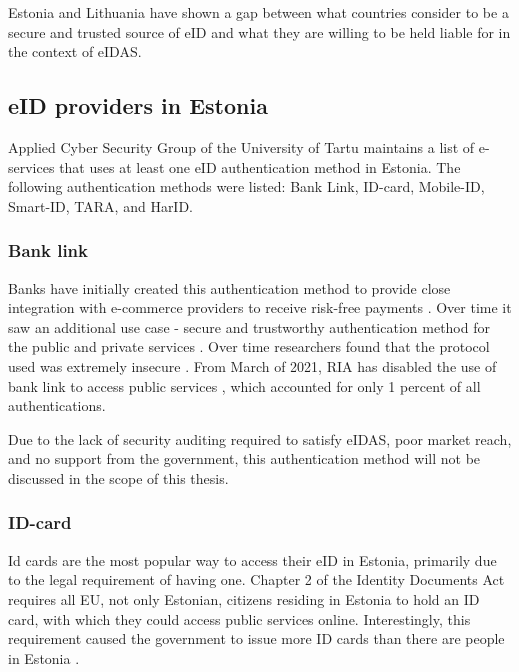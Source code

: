 Estonia and Lithuania have shown a gap between what countries consider to be a secure and trusted source of eID and what they are willing to be held liable for in the context of eIDAS.

\subsection{eID providers in Estonia}

Applied Cyber Security Group of the University of Tartu maintains a list of e-services \cite{ut-eidinestonia} that uses at least one eID authentication method in Estonia. The following authentication methods were listed: Bank Link, ID-card, Mobile-ID, Smart-ID, TARA, and HarID.

\subsubsection{Bank link}

Banks have initially created this authentication method to provide close integration with e-commerce providers to receive risk-free payments \cite{kerem2003internet}. Over time it saw an additional use case - secure and trustworthy authentication method for the public and private services \cite{sebbanklink}. Over time researchers found that the protocol used was extremely insecure \cite{banklinksecurityanalysis}. From March of 2021, RIA has disabled the use of bank link to access public services \cite{ria-deprecates-bank-link}, which accounted for only 1 percent of all authentications.

Due to the lack of security auditing required to satisfy eIDAS, poor market reach, and no support from the government, this authentication method will not be discussed in the scope of this thesis.

\subsubsection{ID-card}

Id cards are the most popular way to access their eID in Estonia, primarily due to the legal requirement of having one. Chapter 2 of the Identity Documents Act \cite{eelaw-idcard} requires all EU, not only Estonian, citizens residing in Estonia to hold an ID card, with which they could access public services online. Interestingly, this requirement caused the government to issue more ID cards than there are people in Estonia \cite{ria-idee,statee-population}.

